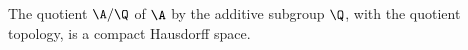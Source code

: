 The quotient $\A/\Q$ of $\A$ by the additive subgroup $\Q$, with the quotient topology, is a compact Hausdorff space.
